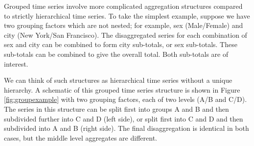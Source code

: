 \documentclass[11pt,a4paper,]{article}
\begin{document}
Grouped time series involve more complicated aggregation structures compared to strictly hierarchical time series. To take the simplest example, suppose we have two grouping factors which are not nested; for example, sex (Male/Female) and city (New York/San Francisco). The disaggregated series for each combination of sex and city can be combined to form city sub-totals, or sex sub-totals. These sub-totals can be combined to give the overall total. Both sub-totals are of interest.

We can think of such structures as hierarchical time series without a unique hierarchy. A schematic of this grouped time series structure is shown in Figure \ref{fig:groupexample} with two grouping factors, each of two levels (A/B and C/D). The series in this structure can be split first into groups A and B and then subdivided further into C and D (left side), or split first into C and D and then subdivided into A and B (right side). The final disaggregation is identical in both cases, but the middle level aggregates are different.
\end{document}
